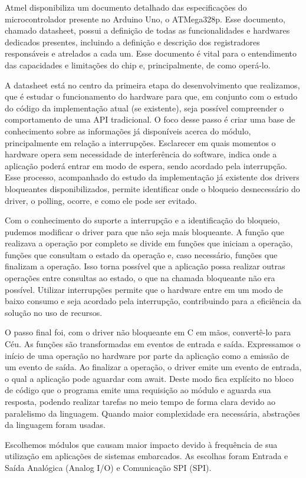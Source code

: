 \documentclass[11pt]{article}
\begin{document}
\par Atmel disponibiliza um documento detalhado \cite{atmegadatasheet} das especificações do microcontrolador presente no Arduino Uno, o ATMega328p. Esse documento, chamado datasheet, possui a definição de todas as funcionalidades e hardwares dedicados presentes, incluindo a definição e descrição dos registradores responsáveis e atrelados a cada um. Esse documento é vital para o entendimento das capacidades e limitações do chip e, principalmente, de como operá-lo.
\par A datasheet está no centro da primeira etapa do desenvolvimento que realizamos, que é estudar o funcionamento do hardware para que, em conjunto com o estudo do código da implementação atual (se existente), seja possível compreender o comportamento de uma API tradicional. O foco desse passo é criar uma base de conhecimento sobre as informações já disponíveis acerca do módulo, principalmente em relação a interrupções. Esclarecer em quais momentos o hardware opera sem necessidade de interferência do software, indica onde a aplicação poderá entrar em modo de espera, sendo acordado pela interrupção. Esse processo, acompanhado do estudo da implementação já existente dos drivers bloqueantes disponibilizados, permite identificar onde o bloqueio desnecessário do driver, o polling, ocorre, e como ele pode ser evitado.
\par Com o conhecimento do suporte a interrupção e a identificação do bloqueio, pudemos modificar o driver para que não seja mais bloqueante. A função que realizava a operação por completo se divide em funções que iniciam a operação, funções que consultam o estado da operação e, caso necessário, funções que finalizam a operação. Isso torna possível que a aplicação possa realizar outras operações entre consultas ao estado, o que na chamada bloqueante não era possível. Utilizar interrupções permite que o hardware entre em um modo de baixo consumo e seja acordado pela interrupção, contribuindo para a eficiência da solução no uso de recursos.
\par O passo final foi, com o driver não bloqueante em C em mãos, convertê-lo para Céu. As funções são transformadas em eventos de entrada e saída. Expressamos o início de uma operação no hardware por parte da aplicação como a emissão de um evento de saída. Ao finalizar a operação, o driver emite um evento de entrada, o qual a aplicação pode aguardar com await. Deste modo fica explícito no bloco de código que o programa emite uma requisição ao módulo e aguarda sua resposta, podendo realizar tarefas no meio tempo de forma clara devido ao paralelismo da linguagem. Quando maior complexidade era necessária, abstrações da linguagem foram usadas.
\par Escolhemos módulos que causam maior impacto devido à frequência de sua utilização em aplicações de sistemas embarcados. As escolhas foram Entrada e Saída Analógica (Analog I/O) e Comunicação SPI (SPI).
\end{document}
